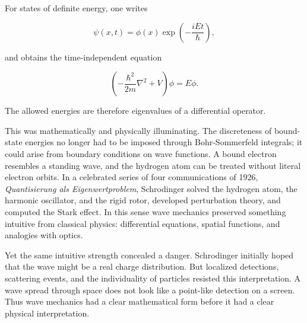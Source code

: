 For states of definite energy, one writes
\begin{linenomath}
    \begin{equation}
        \psi(x,t)=\phi(x)\exp\left(-\frac{iEt}{\hbar}\right),
    \end{equation}
\end{linenomath}
and obtains the time-independent equation
\begin{linenomath}
    \begin{equation}
        \left(-\frac{\hbar^2}{2m}\nabla^2+V\right)\phi=E\phi.
    \end{equation}
\end{linenomath}
The allowed energies are therefore eigenvalues of a differential operator.

This was mathematically and physically illuminating. The discreteness of bound-state energies no longer had to be imposed through Bohr-Sommerfeld integrals; it could arise from boundary conditions on wave functions. A bound electron resembles a standing wave, and the hydrogen atom can be treated without literal electron orbits. In a celebrated series of four communications of 1926, \emph{Quantisierung als Eigenwertproblem}, Schrodinger solved the hydrogen atom, the harmonic oscillator, and the rigid rotor, developed perturbation theory, and computed the Stark effect. In this sense wave mechanics preserved something intuitive from classical physics: differential equations, spatial functions, and analogies with optics.

Yet the same intuitive strength concealed a danger. Schrodinger initially hoped that the wave might be a real charge distribution. But localized detections, scattering events, and the individuality of particles resisted this interpretation. A wave spread through space does not look like a point-like detection on a screen. Thus wave mechanics had a clear mathematical form before it had a clear physical interpretation.

